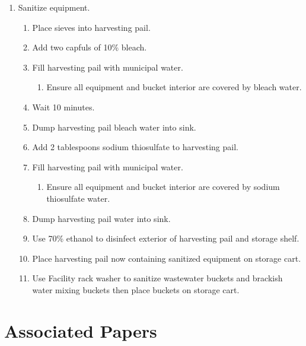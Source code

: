 \documentclass[
  letterpaper,
  DIV=11,
  numbers=noendperiod]{scrreprt}
\providecommand{\tightlist}{%
  \setlength{\itemsep}{0pt}\setlength{\parskip}{0pt}}\usepackage{longtable,booktabs,array}
\begin{document}
\begin{enumerate}
\def\labelenumi{\arabic{enumi}.}
\tightlist
\item
  Sanitize equipment.

  \begin{enumerate}
  \def\labelenumii{\arabic{enumii}.}
  \tightlist
  \item
    Place sieves into harvesting pail.
  \item
    Add two capfuls of 10\% bleach.
  \item
    Fill harvesting pail with municipal water.

    \begin{enumerate}
    \def\labelenumiii{\arabic{enumiii}.}
    \tightlist
    \item
      Ensure all equipment and bucket interior are covered by bleach
      water.
    \end{enumerate}
  \item
    Wait 10 minutes.
  \item
    Dump harvesting pail bleach water into sink.
  \item
    Add 2 tablespoons sodium thiosulfate to harvesting pail.
  \item
    Fill harvesting pail with municipal water.

    \begin{enumerate}
    \def\labelenumiii{\arabic{enumiii}.}
    \tightlist
    \item
      Ensure all equipment and bucket interior are covered by sodium
      thiosulfate water.
    \end{enumerate}
  \item
    Dump harvesting pail water into sink.
  \item
    Use 70\% ethanol to disinfect exterior of harvesting pail and
    storage shelf.
  \item
    Place harvesting pail now containing sanitized equipment on storage
    cart.
  \item
    Use Facility rack washer to sanitize wastewater buckets and brackish
    water mixing buckets then place buckets on storage cart.
  \end{enumerate}
\end{enumerate}

\hypertarget{associated-papers-31}{%
\section{Associated Papers}\label{associated-papers-31}}
\end{document}
